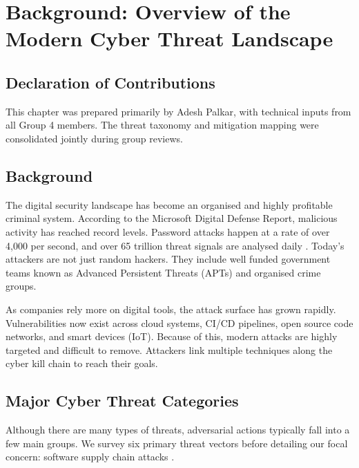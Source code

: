 \chapter{Background: Overview of the Modern Cyber Threat Landscape}
\label{ch:threat-overview}

\section*{Declaration of Contributions}
This chapter was prepared primarily by Adesh Palkar, with technical inputs from all Group 4 members.
The threat taxonomy and mitigation mapping were consolidated jointly during group reviews.

\section{Background}
The digital security landscape has become an organised and highly profitable criminal system. According to the Microsoft Digital Defense Report, malicious activity has reached record levels. Password attacks happen at a rate of over 4,000 per second, and over 65 trillion threat signals are analysed daily \cite{mddr_2023}. Today's attackers are not just random hackers. They include well funded government teams known as Advanced Persistent Threats (APTs) and organised crime groups.

As companies rely more on digital tools, the attack surface has grown rapidly. Vulnerabilities now exist across cloud systems, CI/CD pipelines, open source code networks, and smart devices (IoT). Because of this, modern attacks are highly targeted and difficult to remove. Attackers link multiple techniques along the cyber kill chain to reach their goals.

\section{Major Cyber Threat Categories}
Although there are many types of threats, adversarial actions typically fall into a few main groups. We survey six primary threat vectors before detailing our focal concern: software supply chain attacks  \cite{enisa_etl_2023}.

